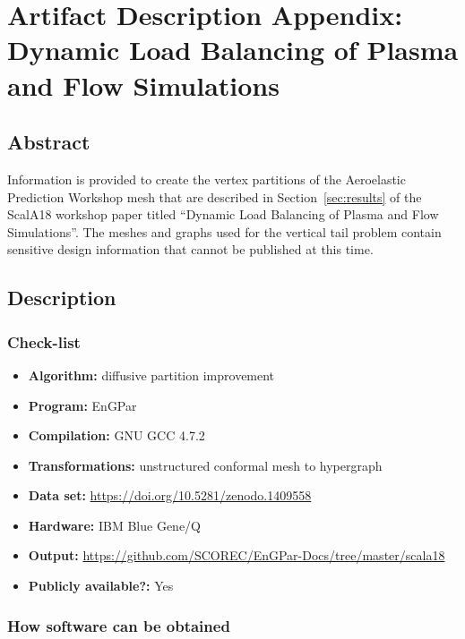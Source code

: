 \appendices

\section{Artifact Description Appendix: 
Dynamic Load Balancing of Plasma and Flow Simulations}

\subsection{Abstract}

Information is provided to create the vertex partitions of the Aeroelastic
Prediction Workshop mesh that are described in Section~\ref{sec:results} of the ScalA18
workshop paper titled ``Dynamic Load Balancing of Plasma and Flow Simulations''.
The meshes and graphs used for the vertical tail problem contain sensitive
design information that cannot be published at this time.

\subsection{Description}

\subsubsection{Check-list}

{\small
\begin{itemize}
  \item {\bf Algorithm: } diffusive partition improvement
  \item {\bf Program: } EnGPar
  \item {\bf Compilation: } GNU GCC 4.7.2
  \item {\bf Transformations: } unstructured conformal mesh to hypergraph
  \item {\bf Data set: } \url{https://doi.org/10.5281/zenodo.1409558}
  \item {\bf Hardware: } IBM Blue Gene/Q
  \item {\bf Output: } \url{https://github.com/SCOREC/EnGPar-Docs/tree/master/scala18}
  \item {\bf Publicly available?: } Yes
\end{itemize}
}

\subsubsection{How software can be obtained}

